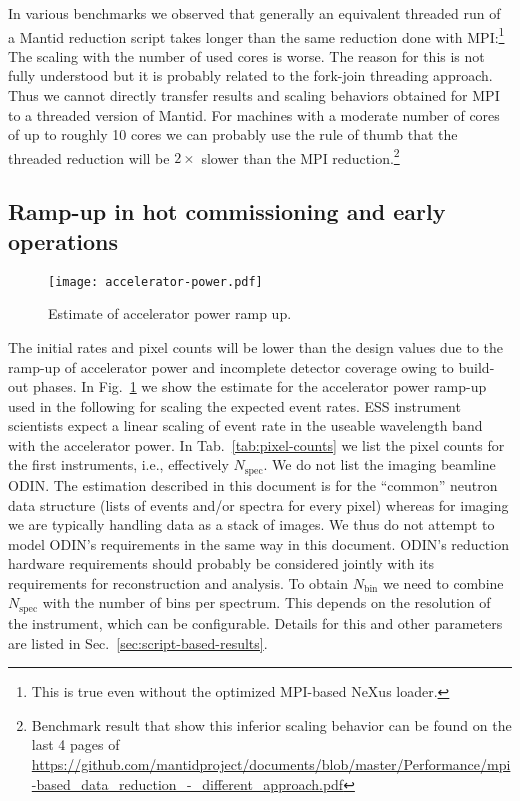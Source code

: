 \documentclass[a4paper,english,numbers=noenddot,bibliography=totoc,chapterprefix=on,DIV=12]{scrartcl}
\newcommand{\Nbin}{N_{\text{bin}}}
\newcommand{\Nspec}{N_{\text{spec}}}
\newcommand{\odin}{ODIN\xspace}
\newcommand{\mantid}{Mantid\xspace}
\begin{document}
In various benchmarks we observed that generally an equivalent threaded run of a \mantid reduction script takes longer than the same reduction done with MPI:\footnote{This is true even without the optimized MPI-based NeXus loader.}
The scaling with the number of used cores is worse.
The reason for this is not fully understood but it is probably related to the fork-join threading approach.
Thus we cannot directly transfer results and scaling behaviors obtained for MPI to a threaded version of \mantid.
For machines with a moderate number of cores of up to roughly 10 cores we can probably use the rule of thumb that the threaded reduction will be $2\times$ slower than the MPI reduction.\footnote{Benchmark result that show this inferior scaling behavior can be found on the last 4 pages of \url{https://github.com/mantidproject/documents/blob/master/Performance/mpi-based_data_reduction_-_different_approach.pdf}}


\subsection{Ramp-up in hot commissioning and early operations}

\begin{figure}
  \centering
\texttt{[image: accelerator-power.pdf]}
\caption{\label{fig:accelerator-power}Estimate of accelerator power ramp up.}
\end{figure}

The initial rates and pixel counts will be lower than the design values due to the ramp-up of accelerator power and incomplete detector coverage owing to build-out phases.
In Fig.~\ref{fig:accelerator-power} we show the estimate for the accelerator power ramp-up used in the following for scaling the expected event rates.
ESS instrument scientists expect a linear scaling of event rate in the useable wavelength band with the accelerator power.
In Tab.~\ref{tab:pixel-counts} we list the pixel counts for the first instruments, i.e., effectively $\Nspec$.
We do not list the imaging beamline \odin.
The estimation described in this document is for the ``common'' neutron data structure (lists of events and/or spectra for every pixel) whereas for imaging we are typically handling data as a stack of images.
We thus do not attempt to model \odin's requirements in the same way in this document.
\odin's reduction hardware requirements should probably be considered jointly with its requirements for reconstruction and analysis.
To obtain $\Nbin$ we need to combine $\Nspec$ with the number of bins per spectrum.
This depends on the resolution of the instrument, which can be configurable.
Details for this and other parameters are listed in Sec.~\ref{sec:script-based-results}.
\end{document}
